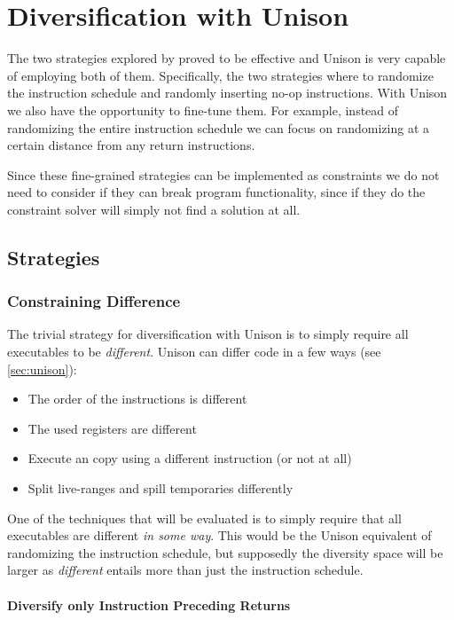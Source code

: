 \chapter{Diversification with Unison}

The two strategies explored by \textcite{large-scale-automated} proved to be
effective and Unison is very capable of employing both of them. Specifically, the two
strategies where to randomize the instruction schedule and randomly inserting no-op
instructions. With Unison we also have the opportunity to fine-tune them. For example,
instead of randomizing the entire instruction schedule we can focus on randomizing at a
certain distance from any return instructions.

Since these fine-grained strategies can be implemented as constraints we do not need to
consider if they can break program functionality, since if they do the constraint solver
will simply not find a solution at all.

\section{Strategies}

\subsection{Constraining Difference}

The trivial strategy for diversification with Unison is to simply require all executables
to be \textit{different}. Unison can differ code in a few ways (see \ref{sec:unison}):

\begin{itemize}
	\item The order of the instructions is different
	\item The used registers are different
	\item Execute an copy using a different instruction (or not at all)
	\item Split live-ranges and spill temporaries differently
\end{itemize}

One of the techniques that will be evaluated is to simply require that all executables
are different \textit{in some way}. This would be the Unison equivalent of randomizing
the instruction schedule, but supposedly the diversity space will be larger as
\textit{different} entails more than just the instruction schedule.

\subsubsection{Diversify only Instruction Preceding Returns}

